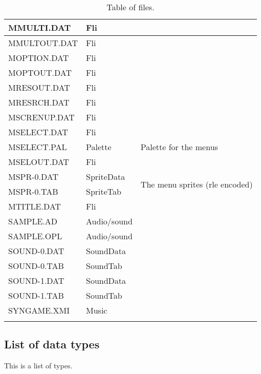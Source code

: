 \documentclass[a4paper,twoside,12pt,dvips]{article}
\begin{document}
\begin{center}
\begin{longtable}{|l|l|l|}
    \hline
    MMULTI.DAT   & Fli           & ~ \\
    \hline
    MMULTOUT.DAT & Fli           & ~ \\
    \hline
    MOPTION.DAT  & Fli           & ~ \\
    \hline
    MOPTOUT.DAT  & Fli           & ~ \\
    \hline
    MRESOUT.DAT  & Fli           & ~ \\
    \hline
    MRESRCH.DAT  & Fli           & ~ \\
    \hline
    MSCRENUP.DAT & Fli           & ~ \\
    \hline
    MSELECT.DAT  & Fli           & ~ \\
    \hline
    MSELECT.PAL  & Palette       & Palette for the menus \\
    \hline
    MSELOUT.DAT  & Fli           & ~ \\
    \hline
    MSPR-0.DAT   & SpriteData    & \multirow{2}{*}{The menu sprites (rle encoded)} \\
    \cline{1-2}
    MSPR-0.TAB   & SpriteTab     & ~ \\
    \hline
    MTITLE.DAT   & Fli           & ~ \\
    \hline
    SAMPLE.AD    & Audio/sound   & ~ \\
    \hline
    SAMPLE.OPL   & Audio/sound   & ~ \\
    \hline
    SOUND-0.DAT  & SoundData     & ~ \\
    \hline
    SOUND-0.TAB  & SoundTab      & ~ \\
    \hline
    SOUND-1.DAT  & SoundData     & ~ \\
    \hline
    SOUND-1.TAB  & SoundTab      & ~ \\
    \hline
    SYNGAME.XMI  & Music         & ~ \\
    \hline

    \caption[Table of files]{Table of files.} \label{tab:files} \\

  \end{longtable}
\end{center}

\subsection{List of data types}
\label{sec:types}

This is a list of types.
\end{document}
